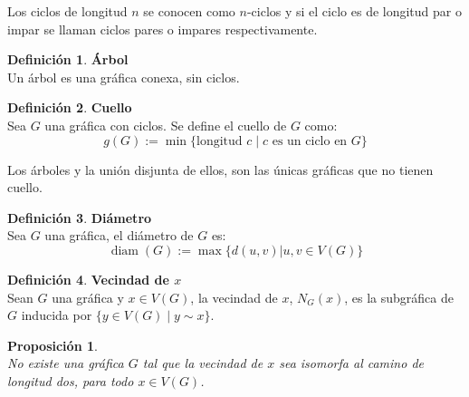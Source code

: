 \documentclass[11pt]{book}
\newtheorem{proposition}{Proposición}
\theoremstyle{definition}
\newtheorem{definition}{Definición}
\DeclareMathOperator{\diam}{diam}
\begin{document}
Los ciclos de longitud $n$ se conocen como $n$-ciclos y si el ciclo es
de longitud par o impar se llaman ciclos pares o impares
respectivamente.

\begin{definition}\textbf{Árbol}\\
  Un árbol es una gráfica conexa, sin ciclos.
\end{definition}

\begin{definition}\textbf{Cuello}\\
  Sea $G$ una gráfica con ciclos. Se define el cuello de $G$ como:
  \begin{equation*}
    g(G):= \min\{ \text{longitud $c$} \mid  \text{$c$ es un ciclo en $G$} \}
  \end{equation*}
\end{definition}

Los árboles y la unión disjunta de ellos, son las únicas gráficas
que no tienen cuello.

\begin{definition}\textbf{Diámetro}\\
  Sea $G$ una gráfica, el diámetro de $G$ es:
  \begin{equation*}
    \diam(G):=\max\{ d(u,v) | u,v \in V(G)\}
  \end{equation*}
\end{definition}

\begin{definition}\textbf{Vecindad de $x$}\\
  Sean $G$ una gráfica y $x\in V(G)$, la vecindad de $x$,
  $N_G(x)$, es la subgráfica de $G$ inducida por
  $\{y\in V(G) \mid y\sim x\}$.
\end{definition}

\begin{proposition}\textbf{}\\
  No existe una gráfica $G$ tal que la vecindad de $x$ sea isomorfa al camino de longitud dos, para todo $ x\in  V(G)$.
\end{proposition}
\end{document}

